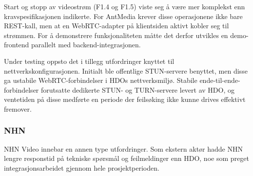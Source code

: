 Start og stopp av videostrøm (F1.4 og F1.5) viste seg å være mer komplekst enn kravspesifikasjonen indikerte. For AntMedia krever disse operasjonene ikke bare REST-kall, men at en WebRTC-adapter på klientsiden aktivt kobler seg til strømmen. For å demonstrere funksjonaliteten måtte det derfor utvikles en demo-frontend parallelt med backend-integrasjonen.

Under testing oppsto det i tillegg utfordringer knyttet til nettverkskonfigurasjonen. Initialt ble offentlige STUN-servere benyttet, men disse ga ustabile WebRTC-forbindelser i HDOs nettverksmiljø. Stabile ende-til-ende-forbindelser forutsatte dedikerte STUN- og TURN-servere levert av HDO, og ventetiden på disse medførte en periode der feilsøking ikke kunne drives effektivt fremover.

\subsubsection{NHN}
\label{subsec:eval-nhn}



NHN Video innebar en annen type utfordringer. Som ekstern aktør hadde NHN lengre responstid på tekniske spørsmål og feilmeldinger enn HDO, noe som preget integrasjonsarbeidet gjennom hele prosjektperioden.


